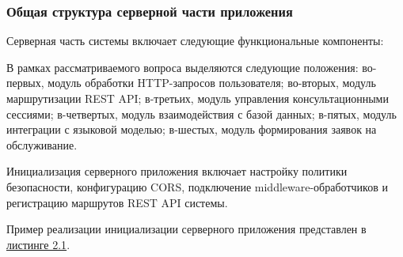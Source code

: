 \documentclass[14pt,a4paper]{extarticle}
\numberwithin{figure}{section}
\numberwithin{table}{section}
\begin{document}
\subsubsection{Общая структура серверной части приложения}

Серверная часть системы включает следующие функциональные компоненты:


В рамках рассматриваемого вопроса выделяются следующие положения: во-первых, модуль обработки HTTP-запросов пользователя; во-вторых, модуль маршрутизации REST API; в-третьих, модуль управления консультационными сессиями; в-четвертых, модуль взаимодействия с базой данных; в-пятых, модуль интеграции с языковой моделью; в-шестых, модуль формирования заявок на обслуживание.


Инициализация серверного приложения включает настройку политики
безопасности, конфигурацию CORS, подключение middleware-обработчиков и
регистрацию маршрутов REST API системы.

Пример реализации инициализации серверного приложения представлен в
\hyperref[ux43bux438ux441211]{листинге 2.1}.
\end{document}
